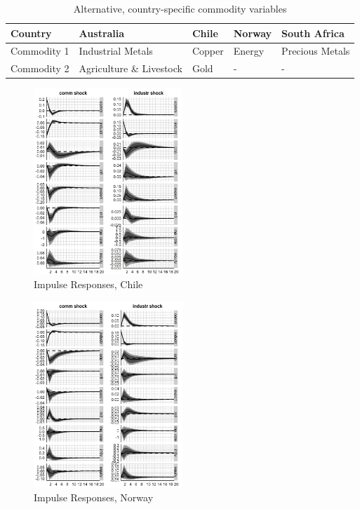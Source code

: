 \documentclass[12pt,]{article}
\begin{document}
\begin{table}[!h]

\caption{\label{tab:unnamed-chunk-4}Alternative, country-specific commodity variables}
\centering
\begin{tabular}[t]{l|l|l|l|l}
\hline
Country & Australia & Chile & Norway & South Africa\\
\hline
Commodity 1 & Industrial Metals & Copper & Energy & Precious Metals\\
\hline
Commodity 2 & Agriculture \& Livestock & Gold & - & -\\
\hline
\end{tabular}
\end{table}

\begin{figure}
\centering
\includegraphics[width=0.50000\textwidth]{img/irf_short_CHL.png}
\caption{Impulse Responses, Chile}
\end{figure}

\begin{figure}
\centering
\includegraphics[width=0.50000\textwidth]{img/irf_short_NOR.png}
\caption{Impulse Responses, Norway}
\end{figure}
\end{document}
